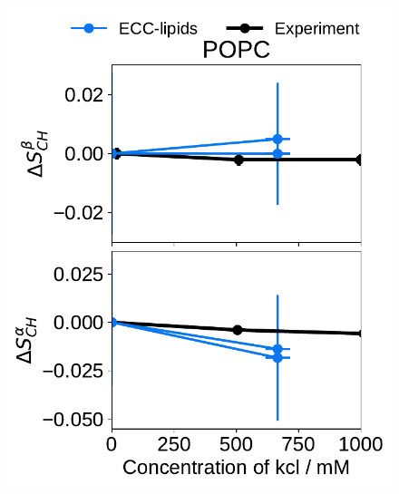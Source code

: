 \documentclass[journal=jpcbfk,manuscript=article]{achemso}
\newlength{\figwidth}
\begin{document}
\begin{figure}[htb!] 
  \centering 
  \includegraphics[width=\figwidth]{../Fig/l17/order_parameters_changes_A-B_POPC_kcl.pdf} 

\end{figure}
\end{document}

